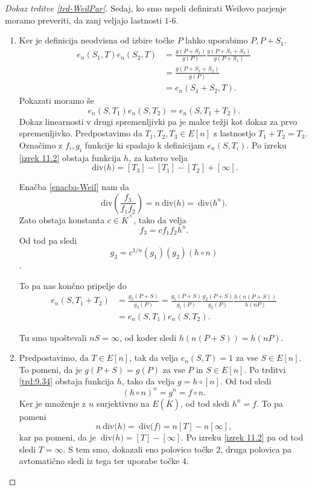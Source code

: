 \documentclass[12pt,a4paper,twoside]{article}
\theoremstyle{definition} %
\theoremstyle{plain} %
\numberwithin{equation}{section}  %
\newcommand{\Div}[1]{\ \text{div(}{#1}\text{)}}
\begin{document}
\begin{proof}[Dokaz trditve \ref{trd-WeilPar}]
Sedaj, ko smo uspeli definirati Weilovo parjenje moramo preveriti, da zanj veljajo lastnosti $1$-$6$.
\begin{enumerate}
\item Ker je definicija neodvisna od izbire točke $P$ lahko uporabimo $P,P+S_1$.
\begin{align}
e_n(S_1,T)e_n(S_2,T) &{}= \frac{g(P+S_1)}{g(P)} \frac{g(P+S_1+S_2)}{g(P+S_1)} \nonumber \\
&{} = \frac{g(P+S_1+S_2)}{g(P)} \nonumber \\
&{} = e_n(S_1+S_2,T). \nonumber
\end{align}
Pokazati moramo še
$$e_n(S,T_1)e_n(S,T_2) = e_n(S,T_1+T_2).$$
Dokaz linearnosti v drugi spremenljivki pa je malce težji kot dokaz za prvo spremenljivko.
Predpostavimo da $T_1,T_2,T_3 \in E[n]$ z lastnostjo $T_1 +T_2 = T_3.$ Označimo z $f_i,g_i$ funkcije ki spadajo k definicijam $e_n(S,T_i)$.
Po izreku \ref{izrek 11.2} obstaja funkcija $h$, za katero velja
$$\Div{h} = [T_3]-[T_1]-[T_2] + [\infty].$$

Enačba \ref{enacba-Weil} nam da
$$\text{div} \left(  \frac{f_3}{f_1f_2}\right) = n \Div{h} = \Div{h^n}.$$
Zato obstaja konstanta $c \in \overline{K}^{\times}$, tako da velja
$$f_3 = cf_1f_2h^n.$$
Od tod pa sledi
$$g_3 = c^{1/n}(g_1)(g_2)(h \circ n)$$.

To pa nas končno pripelje do
\begin{align}
e_n(S,T_1+T_2) &{}= \frac{g_3(P+S)}{g_3(P)} = \frac{g_1(P+S)}{g_1(P)} \frac{g_2(P+S)}{g_2(P)} \frac{h(n(P+S))}{h(nP)} \nonumber \\
&{} = e_n(S,T_1)e_n(S,T_2). \nonumber
\end{align}

Tu smo upoštevali $nS = \infty$, od koder sledi $h(n(P+S)) = h(nP)$.

\item Predpostavimo, da $T \in E[n]$, tak da velja $e_n(S,T)=1$ za vse $S \in E[n]$. To pomeni, da je $g(P+S) = g(P)$ za vse $P$ in $S \in E[n]$. Po trditvi \ref{trd:9.34} %
obstaja funkcija $h$, tako da velja $g = h \circ [n]$. Od tod sledi 
$$(h \circ n) ^n = g^n = f \circ n.$$
Ker je množenje z $n$ surjektivno na $E(\overline{K})$, od tod sledi $h^n = f$. %
To pa pomeni
$$n\Div{h} = \Div{f} = n[T]-n[\infty],$$
kar pa pomeni, da je $\Div{h} = [T] - [\infty]$. Po izreku \ref{izrek 11.2} pa od tod sledi $T = \infty$. S tem smo, dokazali eno polovico točke $2$, druga polovica pa avtomatično sledi iz tega ter uporabe točke $4$.


\end{enumerate}
\end{proof}
\end{document}
